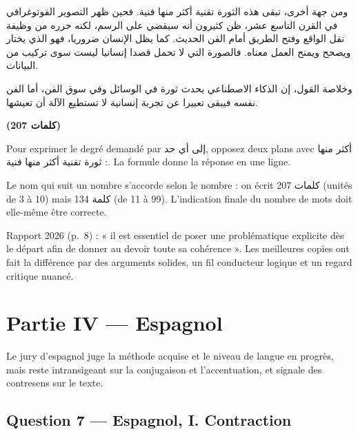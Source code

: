 \documentclass[11pt,a4paper]{article}
\begin{document}
ومن جهة أخرى، تبقى هذه الثورة تقنية أكثر منها فنية. فحين ظهر التصوير الفوتوغرافي في القرن التاسع عشر، ظن كثيرون أنه سيقضي على الرسم، لكنه حرره من وظيفة نقل الواقع وفتح الطريق أمام الفن الحديث. كما يظل الإنسان ضروريا، فهو الذي يختار ويصحح ويمنح العمل معناه. فالصورة التي لا تحمل قصدا إنسانيا ليست سوى تركيب من البيانات.

وخلاصة القول، إن الذكاء الاصطناعي يحدث ثورة في الوسائل وفي سوق الفن، أما الفن نفسه فيبقى تعبيرا عن تجربة إنسانية لا تستطيع الآلة أن تعيشها.

\textbf{(207 كلمات)}

\begin{methode}

Pour exprimer le degré demandé par إلى أي حد, opposez deux plans avec أكثر منها : ثورة تقنية أكثر منها فنية. La formule donne la réponse en une ligne.

\end{methode}

\begin{piege}

Le nom qui suit un nombre s'accorde selon le nombre : on écrit 207 كلمات (unités de 3 à 10) mais 134 كلمة (de 11 à 99). L'indication finale du nombre de mots doit elle-même être correcte.

\end{piege}

\begin{jury}

Rapport 2026 (p.~8) : « il est essentiel de poser une problématique explicite dès le départ afin de donner au devoir toute sa cohérence ». Les meilleures copies ont fait la différence par des arguments solides, un fil conducteur logique et un regard critique nuancé.

\end{jury}

\hypertarget{partie-iv-espagnol}{%
\section{Partie IV --- Espagnol}\label{partie-iv-espagnol}}

Le jury d'espagnol juge la méthode acquise et le niveau de langue en progrès, mais reste intransigeant sur la conjugaison et l'accentuation, et signale des contresens sur le texte.

\hypertarget{question-7-espagnol-i.-contraction}{%
\subsection{Question 7 --- Espagnol, I. Contraction}\label{question-7-espagnol-i.-contraction}}
\end{document}
